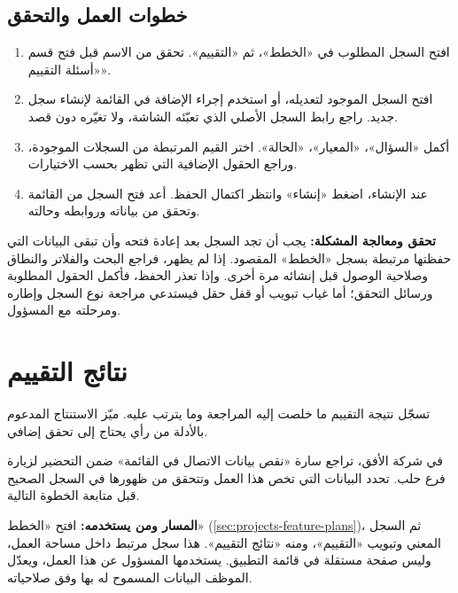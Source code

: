 \subsection{خطوات العمل والتحقق}
\begin{enumerate}
\item افتح السجل المطلوب في «الخطط»، ثم «التقييم». تحقق من الاسم قبل فتح قسم «أسئلة التقييم».
\item افتح السجل الموجود لتعديله، أو استخدم إجراء الإضافة في القائمة لإنشاء سجل جديد. راجع رابط السجل الأصلي الذي تعبّئه الشاشة، ولا تغيّره دون قصد.
\item أكمل «السؤال»، «المعيار»، «الحالة». اختر القيم المرتبطة من السجلات الموجودة، وراجع الحقول الإضافية التي تظهر بحسب الاختيارات.
\item عند الإنشاء، اضغط «إنشاء» وانتظر اكتمال الحفظ. أعد فتح السجل من القائمة وتحقق من بياناته وروابطه وحالته.
\end{enumerate}

\textbf{تحقق ومعالجة المشكلة:} يجب أن تجد السجل بعد إعادة فتحه وأن تبقى البيانات التي حفظتها مرتبطة بسجل «الخطط» المقصود. إذا لم يظهر، فراجع البحث والفلاتر والنطاق وصلاحية الوصول قبل إنشائه مرة أخرى. وإذا تعذر الحفظ، فأكمل الحقول المطلوبة ورسائل التحقق؛ أما غياب تبويب أو قفل حقل فيستدعي مراجعة نوع السجل وإطاره ومرحلته مع المسؤول.

\clearpage
\section{نتائج التقييم}
\label{sec:projects-feature-planning-evaluation-findings}

تسجّل نتيجة التقييم ما خلصت إليه المراجعة وما يترتب عليه. ميّز الاستنتاج المدعوم بالأدلة من رأي يحتاج إلى تحقق إضافي.

\begin{rcnote}
في شركة الأفق، تراجع سارة «نقص بيانات الاتصال في القائمة» ضمن التحضير لزيارة فرع حلب. تحدد البيانات التي تخص هذا العمل وتتحقق من ظهورها في السجل الصحيح قبل متابعة الخطوة التالية.
\end{rcnote}

\textbf{المسار ومن يستخدمه:} افتح «الخطط» (\ref{sec:projects-feature-plans})، ثم السجل المعني وتبويب «التقييم»، ومنه «نتائج التقييم». هذا سجل مرتبط داخل مساحة العمل، وليس صفحة مستقلة في قائمة التطبيق. يستخدمها المسؤول عن هذا العمل، ويعدّل الموظف البيانات المسموح له بها وفق صلاحياته.

